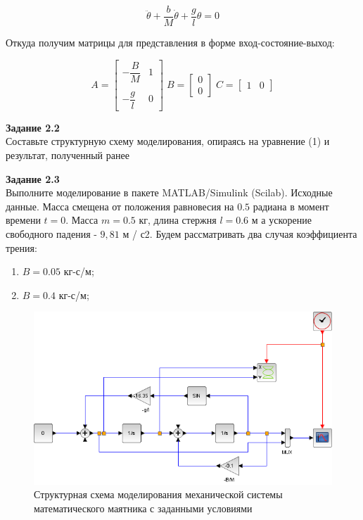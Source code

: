\documentclass[a4paper, 12pt]{article}
\begin{document}
$$ \ddot{\theta} + \frac{b}{M}\dot{\theta} + \frac{g}{l}\theta = 0 $$ 

Откуда получим матрицы для представления в форме вход-состояние-выход:

\[
A = \begin{bmatrix}
-\dfrac{B}{M} & 1\\ \\
-\dfrac{g}{l} & 0 
\end{bmatrix}	
\;
B = \begin{bmatrix}
0 \\
0
\end{bmatrix}
\;
C = \begin{bmatrix}
1 & 0
\end{bmatrix}	
\]

\textbf{Задание 2.2} \\
Составьте структурную схему моделирования, опираясь на уравнение (1) и результат, полученный ранее

\textbf{Задание 2.3} \\ Выполните моделирование в пакете MATLAB/Simulink (Scilab). Исходные
данные. Масса смещена от положения равновесия на $0.5$ радиана в момент времени $t = 0$. Масса $m = 0.5$ кг, длина стержня $l = 0.6$ м а ускорение свободного падения - $9,81$ м
/ с2. Будем рассматривать два случая коэффициента трения: 
\begin{enumerate}
\item $B =0.05$ кг-с/м;
\item $B =0.4$ кг-с/м;
\end{enumerate}


\begin{figure}[h!]
	\centering
	\includegraphics[scale=0.6]{scheme2}
	\caption{Структурная схема моделирования механической системы математического маятника с заданными условиями }
	\label{p:Схема3}
\end{figure}
\end{document}
